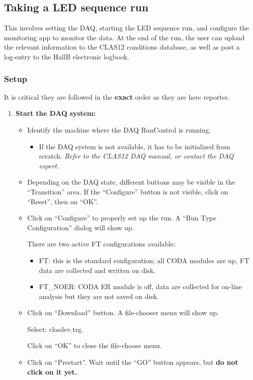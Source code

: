 \documentclass[11.5pt]{article}
\begin{document}
\subsection{Taking a LED sequence run}
This involves setting the DAQ, starting the LED sequence run, and configure the  monitoring app to monitor the data. At the end of the run, the user can upload the relevant information to the CLAS12 conditions database, as well as post a log-entry to the HallB electronic logbook.

\subsubsection{Setup}
It is critical they are followed in the \textbf{exact} order as they are here reporter.
\begin{enumerate}
\item{\textbf{Start the DAQ system: }
\begin{itemize}
\item Identify the machine where the DAQ RunControl is running. 
\begin{itemize}
\item If the DAQ system is not available, it has to be initialized from scratch. \textit{Refer to the CLAS12 DAQ manual, or contact the DAQ expert.}
\end{itemize}
\item Depending on the DAQ state, different buttons may be visible in the ``Transition'' area. If the ``Configure'' button is not visible, click on ``Reset'', then on ``OK''.
\item Click on ``Configure'' to properly set up the run.
A ``Run Type Configuration'' dialog will show up.

There are two active FT  configurations available: 
\begin{itemize}
\item{FT: this is the standard configuration; all CODA modules are up, FT data are collected and written on disk.}
\item{FT\_NOER: CODA ER module is off, data are collected for on-line analysis but they are not saved on disk.}
\end{itemize}

\item{Click on ``Download'' button. A file-chooser menu will show up.

Select: clasdev.trg. 

Click on ``OK'' to close the file-choose menu.
}
\item{Click on ``Prestart''.  Wait until the ``GO'' button appears, but {\bf do not click on it yet.}

}
\end{itemize}}
\end{enumerate}
\end{document}
